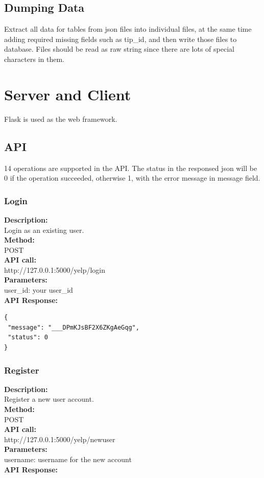 \documentclass[12pt]{article}
\begin{document}
\subsection{Dumping Data}
Extract all data for tables from json files into individual files, at the same time adding required missing fields such as tip\_id, and then write those files to database. Files should be read as raw string since there are lots of special characters in them.
\section{Server and Client}\label{section-api}
Flask is used as the web framework.
\subsection{API}
14 operations are supported in the API. The status in the responsed json will be 0 if the operation succeeded, otherwise 1, with the error message in message field.

\subsubsection{Login}
\textbf{Description:}\\
Login as an existing user.\\
\textbf{Method:}\\
POST\\
\textbf{API call:}\\ 
http://127.0.0.1:5000/yelp/login\\
\textbf{Parameters:}\\
user\_id: your user\_id\\
\textbf{API Response:}

\begin{singlespacing}
\begin{lstlisting}
{
 "message": "___DPmKJsBF2X6ZKgAeGqg",
 "status": 0
}
\end{lstlisting}
\end{singlespacing}

\subsubsection{Register}
\textbf{Description:}\\
Register a new user account.\\
\textbf{Method:}\\
POST\\
\textbf{API call:}\\
http://127.0.0.1:5000/yelp/newuser\\
\textbf{Parameters:}\\
username: username for the new account\\
\textbf{API Response:}
\end{document}
